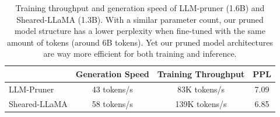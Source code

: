 \begin{table}[h]
    \centering
    \caption{Model structure of Pythia-1.4B, LLM-pruner (1.6B), and Ours (1.3B).
    }
    \label{tab:model_structure}
\end{table}

\begin{table}[h]
\centering
\caption{Training throughput and generation speed of LLM-pruner (1.6B) and Sheared-LLaMA (1.3B). With a similar parameter count, our pruned model structure has a lower perplexity when fine-tuned with the same amount of tokens (around 6B tokens). Yet our pruned model architectures are way more efficient for both training and inference. }
\label{tab:ma_speed}
\begin{tabular}{@{}lccc@{}} \toprule
                    & \textbf{Generation Speed} & \textbf{Training Throughput} & \textbf{PPL} \\ \midrule
{LLM-Pruner} & 43        tokens/s                    & 83K       tokens/s                   & 7.09         \\
{Sheared-LLaMA}       & 58      tokens/s                      & 139K        tokens/s                 & 6.85        \\ \bottomrule
\end{tabular}
\end{table}